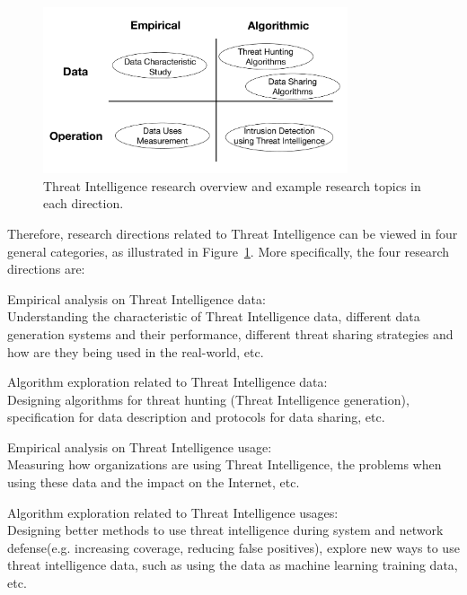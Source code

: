 \begin{dissertationintroduction}
\begin{figure}
\centering
\includegraphics[width=0.8\textwidth]{threat_intel_research_overview.pdf}
\caption{Threat Intelligence research overview and example research
topics in each direction.}
\label{fig:threat_intel_overview}
\end{figure}

Therefore, research directions related to Threat Intelligence can be 
viewed in four general categories, as illustrated in
Figure~\ref{fig:threat_intel_overview}. More specifically, the four 
research directions are: 
\begin{prettylist}
    \item Empirical analysis on Threat Intelligence data: \\
    Understanding the characteristic of Threat Intelligence data, different
    data generation systems and their performance, different threat sharing
    strategies and how are they being used in the real-world, etc.
    
    \item Algorithm exploration related to Threat Intelligence data: \\
    Designing algorithms for threat hunting (Threat Intelligence generation),
    specification for data description and protocols for data sharing, etc.
    
    \item Empirical analysis on Threat Intelligence usage: \\
    Measuring how organizations are using Threat Intelligence, the problems 
    when using these data and the impact on the Internet, etc.
    
    \item Algorithm exploration related to Threat Intelligence usages: \\
    Designing better methods to use threat intelligence during system and 
    network defense(e.g. increasing coverage, reducing false positives),
    explore new ways to use threat intelligence data, such as using the 
    data as machine learning training data, etc.
\end{prettylist}


\end{dissertationintroduction}
